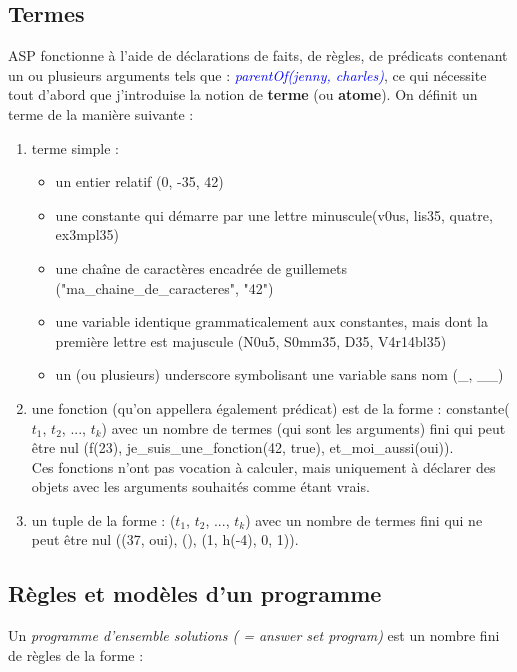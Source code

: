 \documentclass[12pt,a4paper]{article}
\begin{document}
\subsection{Termes}
ASP fonctionne à l'aide de déclarations de faits, de règles, de prédicats contenant un ou plusieurs arguments tels que : \emph{\textcolor{blue}{parentOf(jenny, charles)}}, ce qui nécessite tout d'abord que j'introduise la notion 
de \textbf{terme} (ou \textbf{atome}). On définit un terme de la manière suivante : 
\begin{enumerate}
	\item terme simple :
		\begin{itemize}
		\item un entier relatif (0, -35, 42)
		\item une constante qui démarre par une lettre minuscule(v0us, lis35, quatre, ex3mpl35)
		\item une chaîne de caractères encadrée de guillemets ("ma\_chaine\_de\_caracteres", "42")
		\item une variable identique grammaticalement aux constantes, mais dont la première lettre est majuscule (N0u5, S0mm35, D35, V4r14bl35)
		\item un (ou plusieurs) underscore symbolisant une variable sans nom (\_, \_\_)
		\end{itemize}
	\item une fonction (qu'on appellera également prédicat) est de la forme : constante($t_1$, $t_2$, ..., $t_k$) avec un nombre de termes (qui sont les arguments) fini qui peut être nul (f(23), je\_suis\_une\_fonction(42, 
	true), et\_moi\_aussi(oui)).\\
	Ces fonctions n'ont pas vocation à calculer, mais uniquement à déclarer des objets avec les arguments souhaités comme étant vrais.
	\item un tuple de la forme : ($t_1$, $t_2$, ..., $t_k$) avec un nombre de termes fini qui ne peut être nul ((37, oui), (), (1, h(-4), 0, 1)).
\end{enumerate}
\subsection{Règles et modèles d'un programme}
Un \emph{programme d'ensemble solutions ( = answer set program)} est un nombre fini de règles de la forme :
\end{document}
